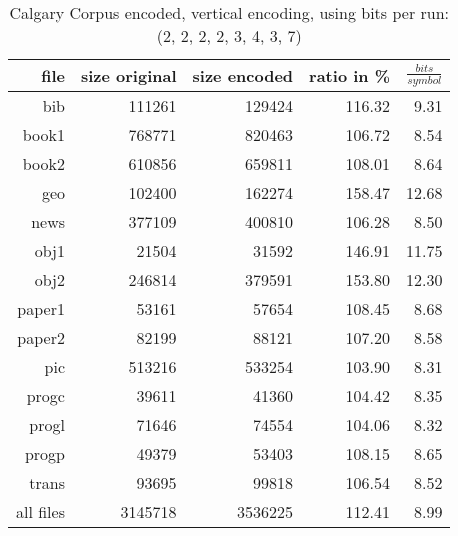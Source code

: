 \begin{table}[H]
	\centering
	\begin{tabular}{r|r|r|r|r}	
		file & size original & size encoded & ratio in \% & $\frac{bits}{symbol}$\\
		\hline
bib & 111261 & 129424 & 116.32 & 9.31 \\
book1 & 768771 & 820463 & 106.72 & 8.54 \\
book2 & 610856 & 659811 & 108.01 & 8.64 \\
geo & 102400 & 162274 & 158.47 & 12.68 \\
news & 377109 & 400810 & 106.28 & 8.50 \\
obj1 & 21504 & 31592 & 146.91 & 11.75 \\
obj2 & 246814 & 379591 & 153.80 & 12.30 \\
paper1 & 53161 & 57654 & 108.45 & 8.68 \\
paper2 & 82199 & 88121 & 107.20 & 8.58 \\
pic & 513216 & 533254 & 103.90 & 8.31 \\
progc & 39611 & 41360 & 104.42 & 8.35 \\
progl & 71646 & 74554 & 104.06 & 8.32 \\
progp & 49379 & 53403 & 108.15 & 8.65 \\
trans & 93695 & 99818 & 106.54 & 8.52 \\
		\hline
		all files & 3145718 & 3536225 & 112.41 & 8.99
	\end{tabular}
	\caption{Calgary Corpus encoded, vertical encoding, using bits per run: (2, 2, 2, 2, 3, 4, 3, 7)}
	\label{tab:t50:Calgary Corpus encoded, vertical encoding, using bits per run: (2, 2, 2, 2, 3, 4, 3, 7)}
\end{table}

